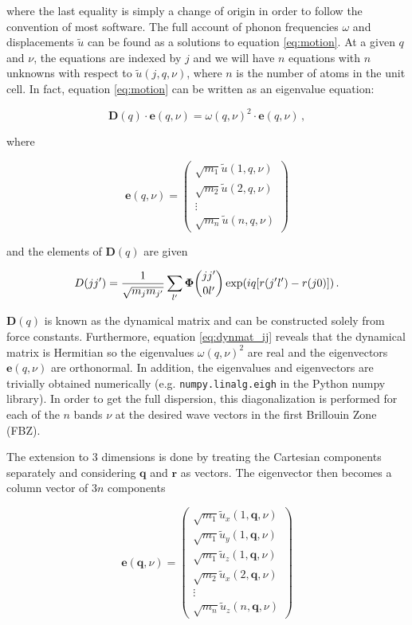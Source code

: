 \noindent where the last equality is simply a change of origin in order to follow the convention of most software. The full account of phonon frequencies $\omega$ and displacements $\tilde{u}$ can be found as a solutions to equation \eqref{eq:motion}. At a given $q$ and $\nu$, the equations are indexed by $j$ and we will have $n$ equations with $n$ unknowns with respect to $\tilde{u}(j,q,\nu)$, where $n$ is the number of atoms in the unit cell. In fact, equation \eqref{eq:motion} can be written as an eigenvalue equation:

\begin{equation}
\bm{D}(q) \cdot \bm{e}(q,\nu) = \omega(q,\nu)^2 \cdot \bm{e}(q,\nu) \, , \label{eq:dynmat}
\end{equation}

\noindent where 

\[ \bm{e}(q,\nu) = \begin{pmatrix}
\sqrt{m_1}\tilde{u}(1,q,\nu) \\
\sqrt{m_2}\tilde{u}(2,q,\nu) \\
\vdots \\
\sqrt{m_n}\tilde{u}(n,q,\nu)
\end{pmatrix} \]

\noindent and the elements of $\bm{D}(q)$ are given 

\begin{equation}
D(j\jp) = \frac{1}{\sqrt{m_j m_{\jp}}} \sum_{\lp} \fczero \exp (iq[r(\jp\lp) - r(j0)]) \, . \label{eq:dynmat_ij}
\end{equation}

\noindent $\bm{D}(q)$ is known as the dynamical matrix and can be constructed solely from force constants. Furthermore, equation \eqref{eq:dynmat_ij} reveals that the dynamical matrix is Hermitian so the eigenvalues $\omega(q,\nu)^2$ are real and the eigenvectors $\bm{e}(q, \nu)$ are orthonormal. In addition, the eigenvalues and eigenvectors are trivially obtained numerically (e.g. \texttt{numpy.linalg.eigh} in the Python numpy library). In order to get the full dispersion, this diagonalization is performed for each of the $n$ bands $\nu$ at the desired wave vectors in the first Brillouin Zone (FBZ). 

The extension to 3 dimensions is done by treating the Cartesian components separately and considering $\bm{q}$ and $\bm{r}$ as vectors. The eigenvector then becomes a column vector of $3n$ components 

\[ \bm{e}(\bm{q},\nu) = \begin{pmatrix}
\sqrt{m_1}\tilde{u}_x(1,\bm{q},\nu) \\
\sqrt{m_1}\tilde{u}_y(1,\bm{q},\nu) \\
\sqrt{m_1}\tilde{u}_z(1,\bm{q},\nu) \\
\sqrt{m_2}\tilde{u}_x(2,\bm{q},\nu) \\
\vdots \\
\sqrt{m_{n}}\tilde{u}_z(n,\bm{q},\nu)
\end{pmatrix} \]

